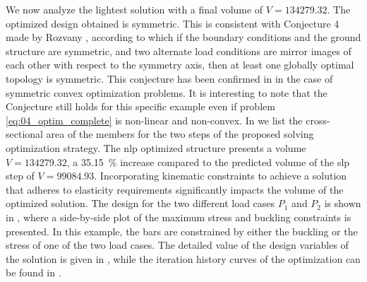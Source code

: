 We now analyze the lightest solution with a final volume of $V=134279.32$. The optimized design obtained is symmetric. This is consistent with Conjecture 4 made by Rozvany , according to which if the boundary conditions and the ground structure are symmetric, and two alternate load conditions are mirror images of each other with respect to the symmetry axis, then at least one globally optimal topology is symmetric. This conjecture has been confirmed in  in the case of symmetric convex optimization problems. It is interesting to note that the Conjecture still holds for this specific example even if problem \ref{eq:04_optim_complete} is non-linear and non-convex. In  we list the cross-sectional area of the members for the two steps of the proposed solving optimization strategy. The \gls{nlp} optimized structure presents a volume $V=134279.32$, a \qty{35.15}{\%} increase compared to the predicted volume of the \gls{slp} step of $V=99084.93$. Incorporating kinematic constraints to achieve a solution that adheres to elasticity requirements significantly impacts the volume of the optimized solution. The design for the two different load cases $P_1$ and $P_2$ is shown in , where a side-by-side plot of the maximum stress and buckling constraints is presented. In this example, the bars are constrained by either the buckling or the stress of one of the two load cases. The detailed value of the design variables of the solution is given in , while the iteration history curves of the optimization can be found in .


